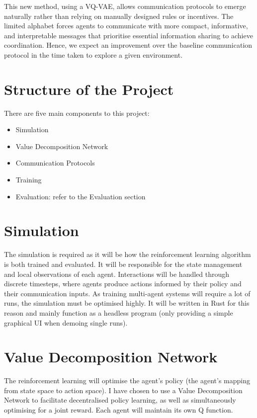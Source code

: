 \documentclass[20pt]{article}
\begin{document}
This new method, using a VQ-VAE, allows communication protocols to emerge naturally rather than relying on manually designed rules or incentives. The limited alphabet forces agents to communicate with more compact, informative, and interpretable messages that prioritise essential information sharing to achieve coordination. Hence, we expect an improvement over the baseline communication protocol in the time taken to explore a given environment.

\pagebreak
\section{Structure of the Project}
There are five main components to this project:

\begin{itemize}
\item Simulation
\item Value Decomposition Network
\item Communication Protocols
\item Training
\item Evaluation: refer to the Evaluation section
\end{itemize}

\section*{Simulation}
The simulation is required as it will be how the reinforcement learning algorithm is both trained and evaluated. It will be responsible for the state management and local observations of each agent. Interactions will be handled through discrete timesteps, where agents produce actions informed by their policy and their communication inputs.  As training multi-agent systems will require a lot of runs, the simulation must be optimised highly. It will be written in Rust for this reason and mainly function as a headless program (only providing a simple graphical UI when demoing single runs).

\section*{Value Decomposition Network}
The reinforcement learning will optimise the agent's policy (the agent's mapping from state space to action space). I have chosen to use a Value Decomposition Network to facilitate decentralised policy learning, as well as simultaneously optimising for a joint reward. Each agent will maintain its own Q function.
\end{document}
